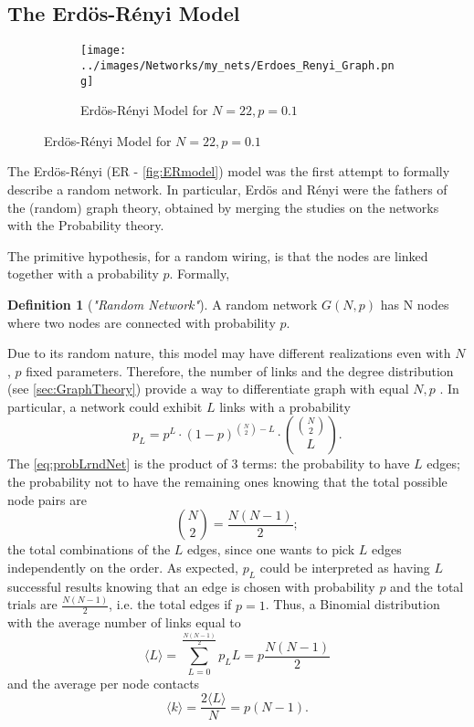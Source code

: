 \documentclass[a4paper,10pt, oneside]{book} %
\theoremstyle{definition}
\newtheorem{definition}{Definition}[section]
\begin{document}
\subsection{The Erdös-Rényi Model}
\label{sec:ER_model}

\begin{figure}[ht]
    \begin{subfigure}{\textwidth}
        \texttt{[image: ../images/Networks/my\_nets/Erdoes\_Renyi\_Graph.png]}
        \centering
        \caption{Erdös-Rényi Model for $N = 22, p = 0.1$}
        \label{fig:ERmodel}
    \end{subfigure}
\end{figure}

The Erdös-Rényi (ER - \autoref{fig:ERmodel}) model was the first attempt to formally describe a random network. In particular, Erdös and Rényi were the fathers of the (random) graph theory, obtained by merging the studies on the networks with the Probability theory.

The primitive hypothesis, for a random wiring, is that the nodes are linked together with a probability $p$. Formally,

\begin{definition}[\textit{"Random Network"}]
A random network $G(N,p)$ has N nodes where two nodes are connected with probability $p$.
\end{definition} 

Due to its random nature, this model may have different realizations even with $N$, $p$ fixed parameters. Therefore, the number of links and the degree distribution (see \autoref{sec:GraphTheory}) provide a way to differentiate graph with equal $ N,p$ . In particular, a network could exhibit $L$ links with a probability
\begin{equation}
	\label{eq:probLrndNet}
	p_L = p^L \cdot (1-p)^{ \binom{N}{2} - L } \cdot \binom{\binom{N}{2}}{L}.
\end{equation}
The \autoref{eq:probLrndNet} is the product of $3$ terms: the probability to have $L$ edges; the probability not to have the remaining ones knowing that the total possible node pairs are \[ \binom{N}{2} = \frac{N(N-1)}{2}; \] the total combinations of the $L$ edges, since one wants to pick $L$ edges independently on the order.
As expected, $p_L$ could be interpreted as having $L$ successful results knowing that an edge is chosen with probability $p$ and the total trials are $\frac{N(N-1)}{2}$, i.e. the total edges if $ p = 1$. Thus, a Binomial distribution with the average number of links equal to
\[ \langle L \rangle = \sum_{L = 0}^{\frac{N(N-1)}{2}} p_L L = p\frac{N(N-1)}{2} \label{eq:meanL} \] and the average per node contacts \[ \langle k\rangle = \frac{2\langle L \rangle}{N} = p(N-1) \label{eq:meank}. \]
\end{document}
